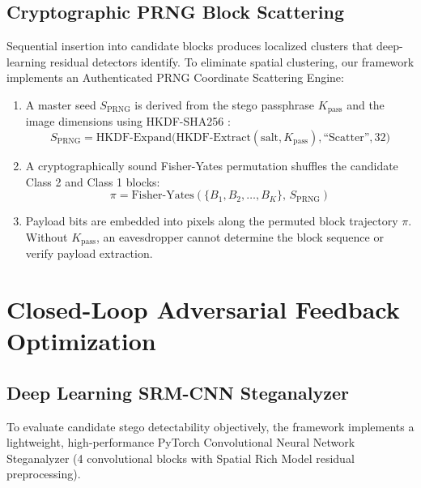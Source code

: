 \documentclass[conference]{IEEEtran}
\begin{document}
\subsection{Cryptographic PRNG Block Scattering}
Sequential insertion into candidate blocks produces localized clusters that deep-learning residual detectors identify. To eliminate spatial clustering, our framework implements an Authenticated PRNG Coordinate Scattering Engine:
\begin{enumerate}
    \item A master seed $S_{\text{PRNG}}$ is derived from the stego passphrase $K_{\text{pass}}$ and the image dimensions using HKDF-SHA256 \cite{rfc5869}:
    \begin{equation}
        S_{\text{PRNG}} = \text{HKDF-Expand}\Big(\text{HKDF-Extract}(\text{salt}, K_{\text{pass}}), \text{``Scatter''}, 32\Big)
    \end{equation}
    \item A cryptographically sound Fisher-Yates permutation shuffles the candidate Class 2 and Class 1 blocks:
    \begin{equation}
        \pi = \text{Fisher-Yates}(\{B_1, B_2, \dots, B_K\}, \, S_{\text{PRNG}})
    \end{equation}
    \item Payload bits are embedded into pixels along the permuted block trajectory $\pi$. Without $K_{\text{pass}}$, an eavesdropper cannot determine the block sequence or verify payload extraction.
\end{enumerate}

\section{Closed-Loop Adversarial Feedback Optimization}

\subsection{Deep Learning SRM-CNN Steganalyzer}
To evaluate candidate stego detectability objectively, the framework implements a lightweight, high-performance PyTorch Convolutional Neural Network Steganalyzer (4 convolutional blocks with Spatial Rich Model residual preprocessing).
\end{document}
